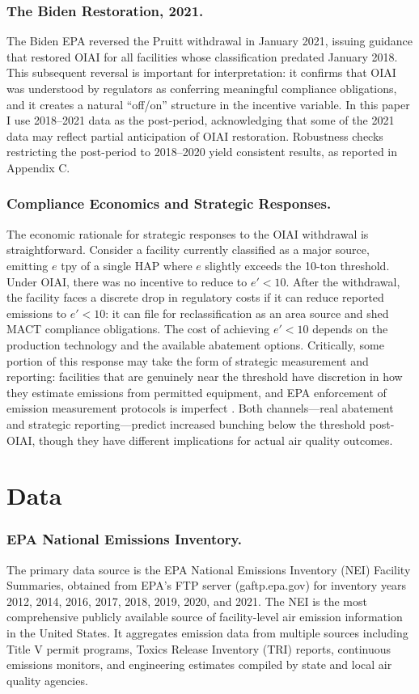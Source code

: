 \documentclass[12pt]{article}
\begin{document}
\subsubsection*{The Biden Restoration, 2021.}
The Biden EPA reversed the Pruitt withdrawal in January 2021, issuing guidance that restored OIAI for all facilities whose classification predated January 2018. This subsequent reversal is important for interpretation: it confirms that OIAI was understood by regulators as conferring meaningful compliance obligations, and it creates a natural ``off/on'' structure in the incentive variable. In this paper I use 2018--2021 data as the post-period, acknowledging that some of the 2021 data may reflect partial anticipation of OIAI restoration. Robustness checks restricting the post-period to 2018--2020 yield consistent results, as reported in Appendix C.

\subsubsection*{Compliance Economics and Strategic Responses.}
The economic rationale for strategic responses to the OIAI withdrawal is straightforward. Consider a facility currently classified as a major source, emitting $e$ tpy of a single HAP where $e$ slightly exceeds the 10-ton threshold. Under OIAI, there was no incentive to reduce to $e' < 10$. After the withdrawal, the facility faces a discrete drop in regulatory costs if it can reduce reported emissions to $e' < 10$: it can file for reclassification as an area source and shed MACT compliance obligations. The cost of achieving $e' < 10$ depends on the production technology and the available abatement options. Critically, some portion of this response may take the form of strategic measurement and reporting: facilities that are genuinely near the threshold have discretion in how they estimate emissions from permitted equipment, and EPA enforcement of emission measurement protocols is imperfect \citep{GrahamHeckman2018}. Both channels---real abatement and strategic reporting---predict increased bunching below the threshold post-OIAI, though they have different implications for actual air quality outcomes.

\section{Data}

\subsubsection*{EPA National Emissions Inventory.}
The primary data source is the EPA National Emissions Inventory (NEI) Facility Summaries, obtained from EPA's FTP server (gaftp.epa.gov) for inventory years 2012, 2014, 2016, 2017, 2018, 2019, 2020, and 2021. The NEI is the most comprehensive publicly available source of facility-level air emission information in the United States. It aggregates emission data from multiple sources including Title V permit programs, Toxics Release Inventory (TRI) reports, continuous emissions monitors, and engineering estimates compiled by state and local air quality agencies.
\end{document}
